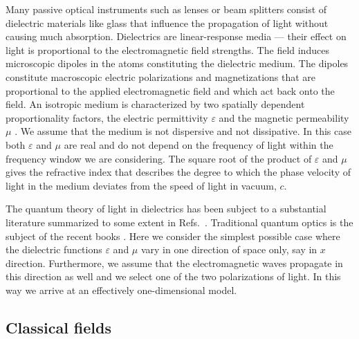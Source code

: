 \documentclass[12pt,amsmath,amssymb]{article}
\numberwithin{equation}{section}
\begin{document}
Many passive optical instruments such as lenses or beam splitters
consist of dielectric materials like glass that influence the
propagation of light without causing much absorption.
Dielectrics are linear-response media --- their effect on light
is proportional to the electromagnetic field strengths.
The field induces microscopic dipoles in the atoms constituting
the dielectric medium.
The dipoles constitute macroscopic electric polarizations and
magnetizations that are proportional to the applied
electromagnetic field and which act back onto the field.
An isotropic medium is characterized by two spatially dependent
proportionality factors, the electric permittivity $\varepsilon$
and the magnetic permeability $\mu$ \cite{Jackson,LL8}.
We assume that the medium is not dispersive and not dissipative.
In this case both $\varepsilon$ and $\mu$ are real and do not depend
on the frequency of light within the frequency window we are
considering. The square root of the product of $\varepsilon$ and $\mu$
gives the refractive index that describes the degree to which
the phase velocity of light in the medium deviates from the speed
of light in vacuum, $c$.

The quantum theory of light in dielectrics has been subject
to a substantial literature summarized to some extent in Refs.\
\cite{Barnett,GlauberLewen,Knoell1,Knoell2,VWW}.
Traditional quantum optics is the subject of the recent books
\cite{Bachor,BR,Cohen,Leonhardt,Loudon,MandelWolf,Perina,PerinaEd,Schleich,SZ,VWW,WM}.
Here we consider the simplest possible case where the dielectric
functions $\varepsilon$ and $\mu$ vary in one direction of space only,
say in $x$ direction. Furthermore, we assume that the electromagnetic
waves propagate in this direction as well and we select one of the two
polarizations of light.
In this way we arrive at an effectively one-dimensional model.

\subsection{Classical fields}
\end{document}

